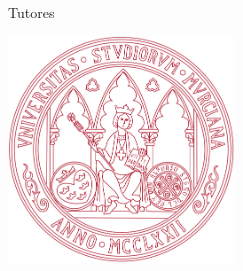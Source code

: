 \begin{titlepage}
    \begin{addmargin}[-1cm]{-3cm}
    \begin{center}
        \large  

        \hfill

        \vfill

        \begingroup
            \color{Maroon}\spacedallcaps{\myTitle} \\ \bigskip
        \endgroup

        \spacedlowsmallcaps{\myName}
        
        \hfill
        
        Tutores
        
        \spacedlowsmallcaps{\myProf}

        \spacedlowsmallcaps{\myOtherProf}
        

        \vfill

        \includegraphics[width=6cm]{gfx/ESCUDO} \\ \medskip

        \myFaculty \\
        \myUni \\ \bigskip


        \vfill                      

    \end{center}  
  \end{addmargin}       
\end{titlepage}   